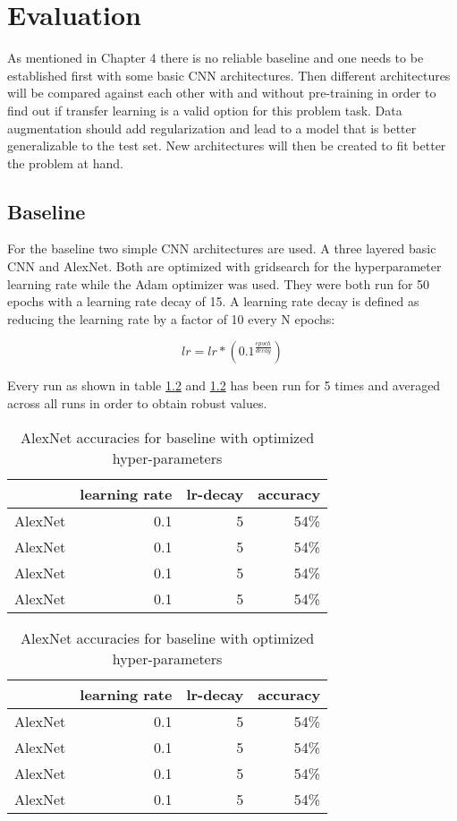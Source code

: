 \chapter{Evaluation}

As mentioned in Chapter 4 there is no reliable baseline and one needs to be established first with some basic CNN architectures. Then different architectures will be compared against each other with and without pre-training in order to find out if transfer learning is a valid option for this problem task. Data augmentation should add regularization and lead to a model that is better generalizable to the test set. New architectures will then be created to fit better the problem at hand.

\section{Baseline}

For the baseline two simple CNN architectures are used. A three layered basic CNN and AlexNet. Both are optimized with gridsearch for the hyperparameter learning rate while the Adam optimizer was used. They were both run for 50 epochs with a learning rate decay of 15. A learning rate decay is defined as reducing the learning rate by a factor of 10 every N epochs:

\[ lr = lr * (0.1^{\frac{epoch}{decay}}) \]


Every run as shown in table \ref{tbl:similarity-test-map} and \ref{tbl:similarity-test-map} has been run for 5 times and averaged across all runs in order to obtain robust values.

\begin{table}[t] \centering
{}
\caption{AlexNet accuracies for baseline with optimized hyper-parameters}
\begin{tabular}{@{}rrrr@{}}
\toprule & learning rate & lr-decay & accuracy \\
\midrule
AlexNet		& 0.1 		& 5		& 54\%  \\
AlexNet		& 0.1 		& 5		& 54\%  \\
AlexNet		& 0.1 		& 5		& 54\%  \\
AlexNet		& 0.1 		& 5		& 54\%  \\
\bottomrule
\end{tabular}
\label{tbl:similarity-test-map}
\end{table}

\begin{table}[t] \centering
{}
\caption{AlexNet accuracies for baseline with optimized hyper-parameters}
\begin{tabular}{@{}rrrr@{}}
\toprule & learning rate & lr-decay & accuracy \\
\midrule
AlexNet		& 0.1 		& 5		& 54\%  \\
AlexNet		& 0.1 		& 5		& 54\%  \\
AlexNet		& 0.1 		& 5		& 54\%  \\
AlexNet		& 0.1 		& 5		& 54\%  \\
\bottomrule
\end{tabular}
\label{tbl:similarity-test-map}
\end{table}

